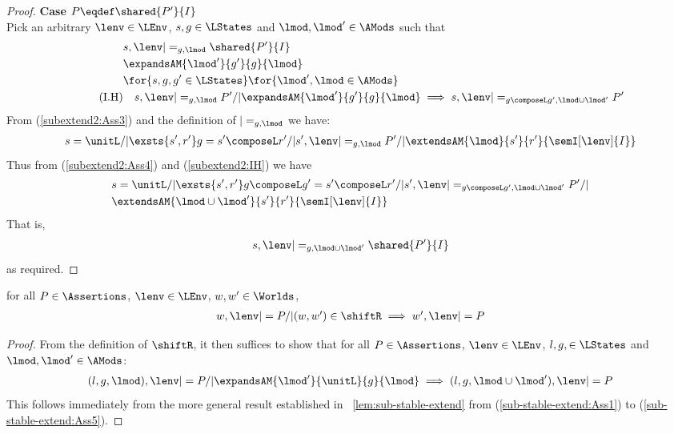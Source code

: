 \begin{lemma}[]
\begin{proof}
\noindent\textbf{Case $P \eqdef \shared{P'}{I}$} \\
Pick an arbitrary $\lenv \in \LEnv$, $s, g \in \LStates$ and $\lmod, \lmod' \in \AMods$ such that
%
\begin{align}
	&s, \lenv |=_{g, \lmod} \shared{P'}{I} \label{subextend2:Ass3}\\
	& \expandsAM{\lmod'}{g'}{g}{\lmod} \label{subextend2:Ass4}\\
	& \for{s, g , g'\in \LStates} \for{\lmod', \lmod \in \AMods} \nonumber\\
	\tag{I.H} & 
	\quad s, \lenv |=_{g, \lmod} P' /| \expandsAM{\lmod'}{g'}{g}{\lmod} \implies s, \lenv |=_{g \composeL g', \lmod \cup \lmod'} P' \label{subextend2:IH}
\end{align}
%
From (\ref{subextend2:Ass3}) and the definition of $|=_{g, \lmod}$ we have:
%
\begin{align*}
	s = \unitL /| \exsts{s', r'} g = s' \composeL r' /| s', \lenv |=_{g, \lmod} P' /| \extendsAM{\lmod}{s'}{r'}{\semI[\lenv]{I}} 
\end{align*}  
%
Thus from (\ref{subextend2:Ass4}) and (\ref{subextend2:IH}) we have
%
\begin{align*}
	& s = \unitL /| \exsts{s', r'} g \composeL g' = s' \composeL r' /| s', \lenv |=_{g \composeL g', \lmod \cup \lmod'} P' /|\\
	& \extendsAM{\lmod \cup \lmod'}{s'}{r'}{\semI[\lenv]{I}}
\end{align*}
%
That is,
%
\begin{align*}
	s, \lenv |=_{g, \lmod \cup \lmod'} \shared{P'}{I}
\end{align*}
%
as required.
\end{proof}
%
\end{lemma}
%
%
\begin{lemma}[]\label{lem:sub-stable-shift}
for all $P \in \Assertions$, $\lenv \in \LEnv$, $w, w' \in \Worlds$, 
% 
\[
\begin{array}{@{} l @{}}
	w, \lenv |= P /| (w, w') \in \shiftR 
	\implies  w', \lenv |= P
\end{array}
\]
%
\begin{proof}
From the definition of $\shiftR$, it then suffices to show that for all $P \in \Assertions$, $\lenv \in \LEnv$, $l, g, \in \LStates$ and $\lmod, \lmod' \in \AMods$: 
% 
\[
\begin{array}{@{} l @{}}
	(l, g, \lmod), \lenv |= P /| 
	\expandsAM{\lmod'}{\unitL}{g}{\lmod}
	 \implies  (l, g, \lmod \cup \lmod'), \lenv |= P
\end{array}
\]
%
This follows immediately from the more general result established in \lem~\ref{lem:sub-stable-extend} from (\ref{sub-stable-extend:Ass1}) to (\ref{sub-stable-extend:Ass5}).
\end{proof}
%
\end{lemma}

